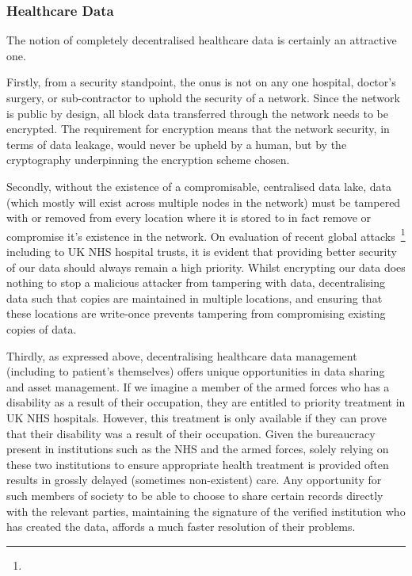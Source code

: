 \subsubsection{Healthcare Data}

The notion of completely decentralised healthcare data is certainly an attractive one.

Firstly, from a security standpoint, the onus is not on any one hospital, doctor's surgery, or sub-contractor to uphold the security of a network. Since the network is public by design, all block data transferred through the network needs to be encrypted. The requirement for encryption means that the network security, in terms of data leakage, would never be upheld by a human, but by the cryptography underpinning the encryption scheme chosen.

Secondly, without the existence of a compromisable, centralised data lake, data (which mostly will exist across multiple nodes in the network) must be tampered with or removed from every location where it is stored to in fact remove or compromise it's existence in the network. On evaluation of recent global attacks~\footnote{
} including to UK NHS hospital trusts, it is evident that providing better security of our data should always remain a high priority. Whilst encrypting our data does nothing to stop a malicious attacker from tampering with data, decentralising data such that copies are maintained in multiple locations, and ensuring that these locations are write-once prevents tampering from compromising existing copies of data.

Thirdly, as expressed above, decentralising healthcare data management (including to patient's themselves) offers unique opportunities in data sharing and asset management.
If we imagine a member of the armed forces who has a disability as a result of their occupation, they are entitled to priority treatment in UK NHS hospitals. However, this treatment is only available if they can prove that their disability was a result of their occupation. Given the bureaucracy present in institutions such as the NHS and the armed forces, solely relying on these two institutions to ensure appropriate health treatment is provided often results in grossly delayed (sometimes non-existent) care. Any opportunity for such members of society to be able to choose to share certain records directly with the relevant parties, maintaining the signature of the verified institution who has created the data, affords a much faster resolution of their problems.
